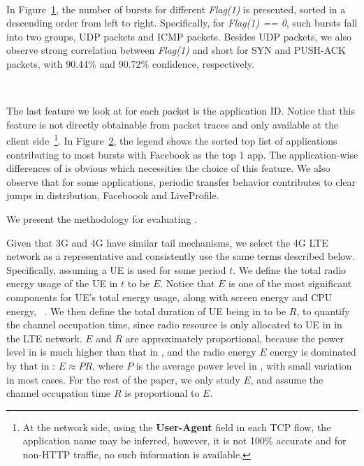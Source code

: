 \begin{figure}[t]
\centering
{} \\
\label{fig:flag1.bar}
\end{figure}

In Figure~\ref{fig:flag1.bar}, the number of bursts for different {\em Flag(1)} is presented, sorted in a descending order from left to right. Specifically, for {\em Flag(1) == 0}, such bursts fall into two groups, UDP packets and ICMP packets. Besides UDP packets, we also observe strong correlation between {\em Flag(1)} and short \IBTS for SYN and PUSH-ACK packets, with 90.44\% and 90.72\% confidence, respectively.


\begin{figure}[t]
\centering
{} \\
\label{fig:appid1}
\end{figure}
The last feature we look at for each packet is the application ID. Notice that this feature is not directly obtainable from packet traces and only available at the client side~\footnote{At the network side, using the \textbf{User-Agent} field in each TCP flow, the application name may be inferred, however, it is not 100\% accurate and for non-HTTP traffic, no such information is available.}. In Figure~\ref{fig:appid1}, the legend shows the sorted top list of applications contributing to most bursts with Facebook as the top 1 app. The application-wise differences of \IBT is obvious which necessities the choice of this feature. We also observe that for some applications, periodic transfer behavior contributes to clear jumps in \IBT distribution, \eg Faceboook and LiveProfile.




\label{sec:method}

We present the methodology for evaluating \NAME.



Given that 3G and 4G have similar tail mechanisms, we select the 4G LTE network as a representative and consistently use the same terms described below. Specifically, assuming a UE is used for some period $t$. We define the total radio energy usage of the UE in $t$ to be $E$. Notice that $E$ is one of the most significant components for UE's total energy usage, along with screen energy and CPU energy, \etc~\cite{mobisys.aro}. We then define the total duration of UE being in \RC to be $R$, to quantify the channel occupation time, since radio resource is only allocated to UE in \RC in the LTE network. $E$ and $R$ are approximately proportional, because the power level in \RC is much higher than that in \RI, and the radio energy $E$ energy is dominated by that in \RC: $E \approx PR$, where $P$ is the average power level in \RC, with small variation in most cases. For the rest of the paper, we only study $E$, and assume the channel occupation time $R$ is proportional to $E$.

